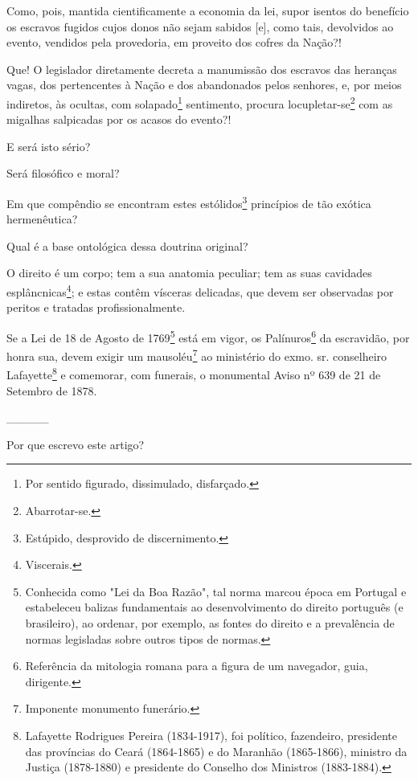 Como, pois, mantida cientificamente a economia da lei, supor isentos do
benefício os escravos fugidos cujos donos não sejam sabidos {[}e{]},
como tais, devolvidos ao evento, vendidos pela provedoria, em proveito
dos cofres da Nação?!

Que! O legislador diretamente decreta a manumissão dos escravos das
heranças vagas, dos pertencentes à Nação e dos abandonados pelos
senhores, e, por meios indiretos, às ocultas, com solapado\footnote{
  Por sentido figurado, dissimulado, disfarçado.} sentimento, procura
locupletar-se\footnote{Abarrotar-se.} com as migalhas salpicadas por
os acasos do evento?!

E será isto sério?

Será filosófico e moral?

Em que compêndio se encontram estes estólidos\footnote{Estúpido,
  desprovido de discernimento.} princípios de tão exótica hermenêutica?

Qual é a base ontológica dessa doutrina original?

O direito é um corpo; tem a sua anatomia peculiar; tem as suas cavidades
esplâncnicas\footnote{Viscerais.}; e estas contêm vísceras delicadas,
que devem ser observadas por peritos e tratadas profissionalmente.

Se a Lei de 18 de Agosto de 1769\footnote{Conhecida como "Lei da Boa
  Razão", tal norma marcou época em Portugal e estabeleceu balizas
  fundamentais ao desenvolvimento do direito português (e brasileiro),
  ao ordenar, por exemplo, as fontes do direito e a prevalência de
  normas legisladas sobre outros tipos de normas.} está em vigor, os
Palínuros\footnote{Referência da mitologia romana para a figura de um
  navegador, guia, dirigente.} da escravidão, por honra sua, devem
exigir um mausoléu\footnote{Imponente monumento funerário.} ao
ministério do exmo. sr. conselheiro Lafayette\footnote{Lafayette
  Rodrigues Pereira (1834-1917), foi político, fazendeiro, presidente
  das províncias do Ceará (1864-1865) e do Maranhão (1865-1866),
  ministro da Justiça (1878-1880) e presidente do Conselho dos Ministros
  (1883-1884).} e comemorar, com funerais, o monumental Aviso nº 639 de
21 de Setembro de 1878.

\_\_\_\_\_

Por que escrevo este artigo?

